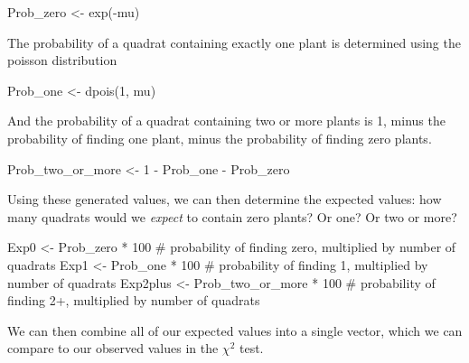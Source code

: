 \documentclass[
  letterpaper,
  DIV=11,
  numbers=noendperiod]{scrreprt}
\newenvironment{Shaded}{\begin{snugshade}}{\end{snugshade}}
\newcommand{\CommentTok}[1]{\textcolor[rgb]{0.37,0.37,0.37}{#1}}
\newcommand{\DecValTok}[1]{\textcolor[rgb]{0.68,0.00,0.00}{#1}}
\newcommand{\FunctionTok}[1]{\textcolor[rgb]{0.28,0.35,0.67}{#1}}
\newcommand{\NormalTok}[1]{\textcolor[rgb]{0.00,0.23,0.31}{#1}}
\newcommand{\OtherTok}[1]{\textcolor[rgb]{0.00,0.23,0.31}{#1}}
\newcommand{\SpecialCharTok}[1]{\textcolor[rgb]{0.37,0.37,0.37}{#1}}
\begin{document}
\begin{Shaded}
\begin{Highlighting}[]
\NormalTok{Prob\_zero }\OtherTok{\textless{}{-}} \FunctionTok{exp}\NormalTok{(}\SpecialCharTok{{-}}\NormalTok{mu)}
\end{Highlighting}
\end{Shaded}

The probability of a quadrat containing exactly one plant is determined
using the poisson distribution

\begin{Shaded}
\begin{Highlighting}[]
\NormalTok{Prob\_one }\OtherTok{\textless{}{-}} \FunctionTok{dpois}\NormalTok{(}\DecValTok{1}\NormalTok{, mu)}
\end{Highlighting}
\end{Shaded}

And the probability of a quadrat containing two or more plants is 1,
minus the probability of finding one plant, minus the probability of
finding zero plants.

\begin{Shaded}
\begin{Highlighting}[]
\NormalTok{Prob\_two\_or\_more }\OtherTok{\textless{}{-}} \DecValTok{1} \SpecialCharTok{{-}}\NormalTok{ Prob\_one }\SpecialCharTok{{-}}\NormalTok{ Prob\_zero}
\end{Highlighting}
\end{Shaded}

Using these generated values, we can then determine the expected values:
how many quadrats would we \emph{expect} to contain zero plants? Or one?
Or two or more?

\begin{Shaded}
\begin{Highlighting}[]
\NormalTok{Exp0 }\OtherTok{\textless{}{-}}\NormalTok{ Prob\_zero }\SpecialCharTok{*} \DecValTok{100} \CommentTok{\# probability of finding zero, multiplied by number of quadrats}
\NormalTok{Exp1 }\OtherTok{\textless{}{-}}\NormalTok{ Prob\_one }\SpecialCharTok{*} \DecValTok{100} \CommentTok{\# probability of finding 1, multiplied by number of quadrats}
\NormalTok{Exp2plus }\OtherTok{\textless{}{-}}\NormalTok{ Prob\_two\_or\_more }\SpecialCharTok{*} \DecValTok{100} \CommentTok{\# probability of finding 2+, multiplied by number of quadrats}
\end{Highlighting}
\end{Shaded}

We can then combine all of our expected values into a single vector,
which we can compare to our observed values in the \(\chi^2\) test.
\end{document}

